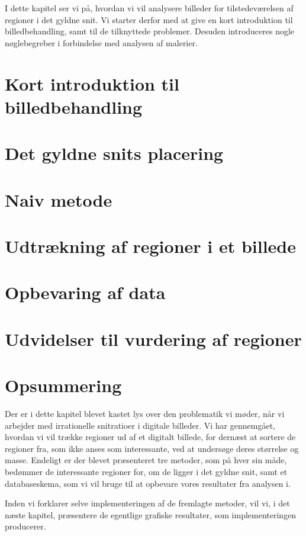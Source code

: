 {
{\sffamily I dette kapitel ser vi på, hvordan vi vil analysere billeder
for tilstedeværelsen af regioner i det gyldne snit. Vi starter derfor
med at give en kort introduktion til billedbehandling, samt til de
tilknyttede problemer. Desuden introduceres nogle nøglebegreber i
forbindelse med analysen af malerier.
}

\section{Kort introduktion til billedbehandling\label{section_kort_intro}}


\section{Det gyldne snits placering\label{section_opdeling}}


\section{Naiv metode\label{section_naiv}}


\section{Udtrækning af regioner i et billede\label{section_udtraek}}


\section{Opbevaring af data\label{section_database}}


\section{Udvidelser til vurdering af regioner\label{section_udvidelser}}


\section*{Opsummering}
Der er i dette kapitel blevet kastet lys over den problematik vi møder,
når vi arbejder med irrationelle snitratioer i digitale billeder. Vi har
gennemgået, hvordan vi vil trække regioner ud af et digitalt billede,
for dernæst at sortere de regioner fra, som ikke anses som interessante,
ved at undersøge deres størrelse og masse.  Endeligt er der blevet
præsenteret tre metoder, som på hver sin måde, bedømmer de interessante
regioner for, om de ligger i det gyldne snit, samt et databaseskema, som
vi vil bruge til at opbevare vores resultater fra analysen i.

Inden vi forklarer selve implementeringen af de fremlagte metoder, vil
vi, i det næste kapitel, præsentere de egentlige grafiske resultater,
som implementeringen producerer.

}

